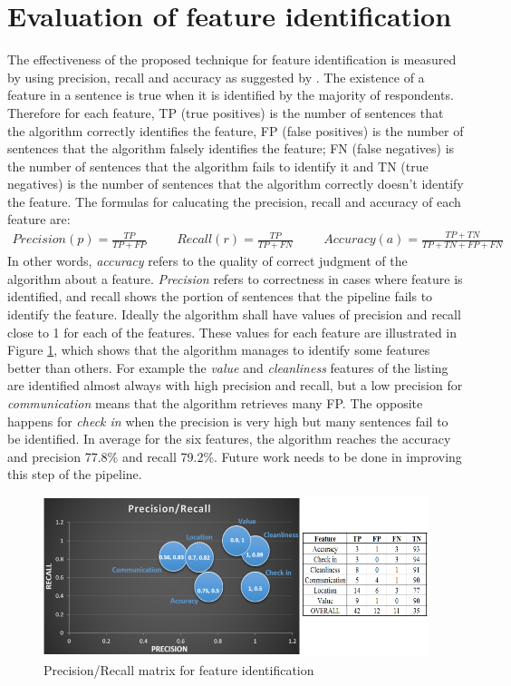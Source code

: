 \section{Evaluation of feature identification}
The effectiveness of the proposed technique for feature identification is measured by using precision, recall and accuracy as suggested by \cite{huang2006performance}.
The existence of a feature in a sentence is true when it is identified by the majority of respondents. Therefore for each feature, TP (true positives) is the number of sentences that the algorithm correctly identifies the feature, FP (false positives) is the number of sentences that the algorithm falsely identifies the feature; FN (false negatives) is the number of sentences that the algorithm fails to identify it and TN (true negatives) is the number of sentences that the algorithm correctly doesn't identify the feature. The formulas for calucating the precision, recall and accuracy of each feature are:
\begin{align}
Precision  (p) =\frac{TP}{TP+FP} \hspace{1cm}
Recall  (r) = \frac{TP}{TP + FN} \hspace{1cm}
Accuracy (a) = \frac{TP + TN}{TP+TN+FP+FN}
\end{align}
In other words, \textit{accuracy} refers to the quality of correct judgment of the algorithm about a feature.  \textit{Precision} refers to correctness in cases where feature is identified, and recall shows the portion of sentences that the pipeline fails to identify the feature. Ideally the algorithm shall have values of precision and recall close to 1 for each of the features.
These values for each feature are illustrated in Figure \ref{fig:matrix}, which shows that the algorithm manages to identify some features better than others. For example the \textit{value} and \textit{cleanliness} features of the listing are identified almost always with high precision and recall, but a low precision for \textit{communication} means that the algorithm retrieves many FP. The opposite happens for \textit{check in} when the precision is very high but many sentences fail to be identified. In average for the six features, the algorithm reaches the accuracy and precision 77.8\% and recall 79.2\%. Future work needs to be done in improving this step of the pipeline.
\begin{figure}[h!]
	\centering
	\includegraphics[height=0.3\textheight]{PR_table}
	\caption{Precision/Recall matrix for feature identification}
	\label{fig:matrix}
\end{figure}